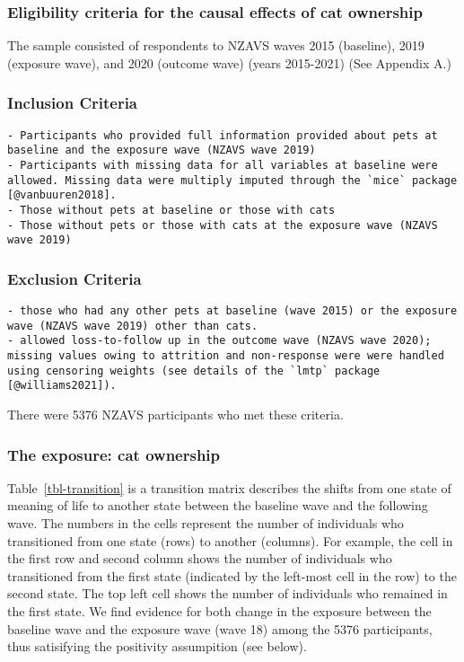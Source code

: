 \documentclass[
  singlecolumn,
  9pt]{article}
\begin{document}
\subsubsection{Eligibility criteria for the causal effects of cat
ownership}\label{eligibility-criteria-for-the-causal-effects-of-cat-ownership}

The sample consisted of respondents to NZAVS waves 2015 (baseline), 2019
(exposure wave), and 2020 (outcome wave) (years 2015-2021) (See Appendix
A.)

\subsubsection{Inclusion Criteria}\label{inclusion-criteria}

\begin{verbatim}
- Participants who provided full information provided about pets at baseline and the exposure wave (NZAVS wave 2019)
- Participants with missing data for all variables at baseline were allowed. Missing data were multiply imputed through the `mice` package [@vanbuuren2018].
- Those without pets at baseline or those with cats
- Those without pets or those with cats at the exposure wave (NZAVS wave 2019)
\end{verbatim}

\subsubsection{Exclusion Criteria}\label{exclusion-criteria}

\begin{verbatim}
- those who had any other pets at baseline (wave 2015) or the exposure wave (NZAVS wave 2019) other than cats.
- allowed loss-to-follow up in the outcome wave (NZAVS wave 2020); missing values owing to attrition and non-response were were handled using censoring weights (see details of the `lmtp` package [@williams2021]).
\end{verbatim}

There were 5376 NZAVS participants who met these criteria.

\subsubsection{The exposure: cat
ownership}\label{the-exposure-cat-ownership}

Table~\ref{tbl-transition} is a transition matrix describes the shifts
from one state of meaning of life to another state between the baseline
wave and the following wave. The numbers in the cells represent the
number of individuals who transitioned from one state (rows) to another
(columns). For example, the cell in the first row and second column
shows the number of individuals who transitioned from the first state
(indicated by the left-most cell in the row) to the second state. The
top left cell shows the number of individuals who remained in the first
state. We find evidence for both change in the exposure between the
baseline wave and the exposure wave (wave 18) among the 5376
participants, thus satisifying the positivity assumpition (see below).
\end{document}
